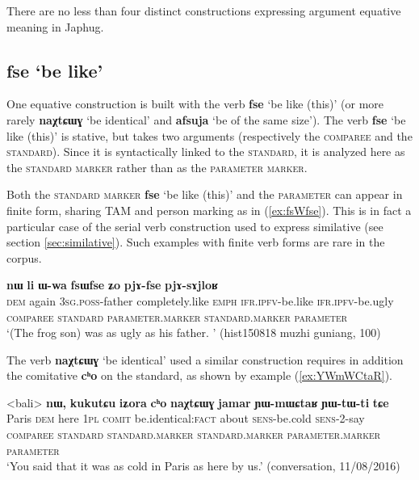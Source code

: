 \documentclass[oneside,a4paper,11pt]{article}
\newcommand{\ipa}[1]{{\phon\textbf{#1}}}
\newcommand{\forme}[2]{\ipa{#1} `#2'}
\begin{document}
There are no less than four distinct constructions expressing argument equative meaning in Japhug. 

\subsection{\forme{fse}{be like}} \label{sec:fse}
One equative construction is built with the verb \forme{fse}{be like (this)} (or more rarely \forme{naχtɕɯɣ}{be identical} and \forme{afsuja}{be of the same size}). The verb \forme{fse}{be like (this)} is stative, but takes two arguments (respectively the \textsc{comparee} and the \textsc{standard}). Since it is syntactically linked to the \textsc{standard}, it is analyzed here as the \textsc{standard marker} rather than as the \textsc{parameter marker}.

Both  the \textsc{standard marker} \forme{fse}{be like (this)} and the \textsc{parameter} can appear in finite form, sharing TAM and person marking as in (\ref{ex:fsWfse}). This is in fact a particular case of the serial verb construction used to express similative (see section \ref{sec:similative}). Such examples with finite verb forms are rare in the corpus.

\begin{exe}
\ex \label{ex:fsWfse}
\glll
\ipa{nɯ} 	\ipa{li} 	\ipa{ɯ-wa} 	\ipa{fsɯfse} 	\ipa{ʑo} 	\ipa{pjɤ-fse} 	\ipa{pjɤ-sɤjloʁ} \\
\textsc{dem} again \textsc{3sg.poss}-father completely.like \textsc{emph} \textsc{ifr.ipfv}-be.like \textsc{ifr.ipfv}-be.ugly \\
\textsc{comparee} { } \textsc{standard} \textsc{parameter.marker} { } \textsc{standard.marker} \textsc{parameter} \\
\glt `(The frog son) was as ugly as his father. ' (hist150818 muzhi guniang, 100)
\end{exe}

The verb \forme{naχtɕɯɣ}{be identical} used a similar construction requires in addition the comitative \ipa{cʰo} on the standard, as shown by example (\ref{ex:YWmWCtaR}).

\begin{exe}
\ex \label{ex:YWmWCtaR}
\glll 
<bali> 	\ipa{nɯ,} 	{\ipa{kukutɕu} \ipa{iʑora}} 	\ipa{cʰo} 	\ipa{naχtɕɯɣ} 	\ipa{jamar} 	\ipa{ɲɯ-mɯɕtaʁ} 	\ipa{ɲɯ-tɯ-ti} 	\ipa{tɕe} \\
Paris \textsc{dem} {here \textsc{1pl}} \textsc{comit} be.identical:\textsc{fact} about \textsc{sens}-be.cold \textsc{sens}-2-say \\
\textsc{comparee} { }  \textsc{standard} \textsc{standard.marker} \textsc{standard.marker}  \textsc{parameter.marker} \textsc{parameter} \\
\glt `You said that it was as cold in Paris as here by us.' (conversation, 11/08/2016)
\end{exe}
\end{document}
